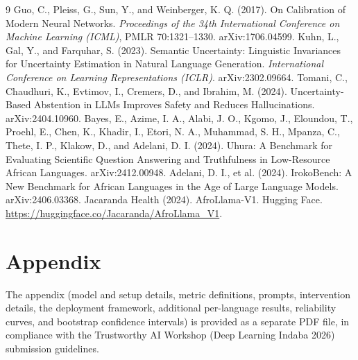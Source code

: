 \documentclass[pmlr]{jmlr}%
\begin{document}
\begin{thebibliography}{9}\small
{} Guo, C., Pleiss, G., Sun, Y., and Weinberger, K. Q. (2017). On
Calibration of Modern Neural Networks. \textit{Proceedings of the 34th International Conference on
Machine Learning (ICML)}, PMLR 70:1321--1330. arXiv:1706.04599.
 Kuhn, L., Gal, Y., and Farquhar, S. (2023). Semantic
Uncertainty: Linguistic Invariances for Uncertainty Estimation in Natural Language Generation.
\textit{International Conference on Learning Representations (ICLR)}. arXiv:2302.09664.
 Tomani, C., Chaudhuri, K., Evtimov, I., Cremers, D., and
Ibrahim, M. (2024). Uncertainty-Based Abstention in LLMs Improves Safety and Reduces Hallucinations.
arXiv:2404.10960.
 Bayes, E., Azime, I. A., Alabi, J. O., Kgomo, J., Eloundou, T.,
Proehl, E., Chen, K., Khadir, I., Etori, N. A., Muhammad, S. H., Mpanza, C., Thete, I. P., Klakow, D.,
and Adelani, D. I. (2024). Uhura: A Benchmark for Evaluating Scientific Question Answering and
Truthfulness in Low-Resource African Languages. arXiv:2412.00948.
 Adelani, D. I., et al. (2024). IrokoBench: A New Benchmark
for African Languages in the Age of Large Language Models. arXiv:2406.03368.
 Jacaranda Health (2024). AfroLlama-V1. Hugging Face.
\url{https://huggingface.co/Jacaranda/AfroLlama_V1}.
\end{thebibliography}

\section*{Appendix}
The appendix (model and setup details, metric definitions, prompts, intervention details, the
deployment framework, additional per-language results, reliability curves, and bootstrap confidence
intervals) is provided as a separate PDF file, in compliance with the Trustworthy AI Workshop
(Deep Learning Indaba 2026) submission guidelines.
\end{document}
